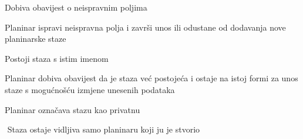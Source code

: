 \begin{packed_item}
\begin{packed_item}
\begin{packed_enum}
						\item $ $Dobiva obavijest o neispravnim poljima$ $
						\item $ $Planinar ispravi neispravna polja i završi unos ili odustane od dodavanja nove planinarske staze$ $
					\end{packed_enum}
					\item[4.a] $ $Postoji staza s istim imenom$ $
					\item[] \begin{packed_enum}
						\item $ $Planinar dobiva obavijest da je staza već postojeća i ostaje na istoj formi za unos staze s mogućnošću izmjene unesenih podataka$ $
					\end{packed_enum}
					\item[5.a] $ $Planinar označava stazu kao privatnu$ $
					\item[] \begin{packed_enum}
						\item $ $ Staza ostaje vidljiva samo planinaru koji ju je stvorio $ $
					\end{packed_enum}
				\end{packed_item}
			\end{packed_item}
			
